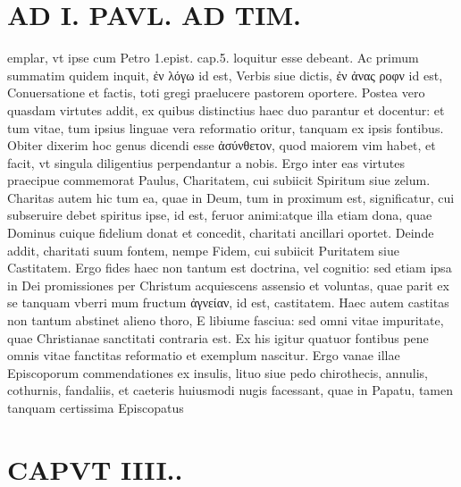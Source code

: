 \documentclass{article}
\begin{document}
\begin{pages}
\section*{AD I. PAVL. AD TIM. }
\marginpar{[ p.250 ]}\pstart emplar, vt ipse cum Petro 1.epist. cap.5. loquitur esse debeant. Ac primum summatim quidem inquit, ἐν λόγω id est, Verbis siue dictis, ἐν ἀνας ροφν id est, Conuersatione et factis, toti gregi praelucere pastorem oportere. Postea vero quasdam virtutes addit, ex quibus distinctius haec duo parantur et docentur: et tum vitae, tum ipsius linguae vera reformatio oritur, tanquam ex ipsis fontibus. Obiter dixerim hoc genus dicendi esse ἀσύνθετον, quod maiorem vim habet, et facit, vt singula diligentius perpendantur a nobis. Ergo inter eas virtutes praecipue commemorat Paulus, Charitatem, cui subiicit Spiritum siue zelum. Charitas autem hic tum ea, quae in Deum, tum in proximum est, significatur, cui subseruire debet spiritus ipse, id est, feruor animi:atque illa etiam dona, quae Dominus cuique fidelium donat et concedit, charitati ancillari oportet. Deinde addit, charitati suum fontem, nempe Fidem, cui subiicit Puritatem siue Castitatem. Ergo fides haec non tantum est doctrina, vel cognitio: sed etiam ipsa in Dei promissiones per Christum acquiescens assensio et voluntas, quae parit ex se tanquam vberri mum fructum ἀγνείαν, id est, castitatem. Haec autem castitas non tantum abstinet alieno thoro, E libiume fasciua: sed omni vitae impuritate, quae Christianae sanctitati contraria est. Ex his igitur quatuor fontibus pene omnis vitae fanctitas reformatio et exemplum nascitur. Ergo vanae illae Episcoporum commendationes ex insulis, lituo siue pedo chirothecis, annulis, cothurnis, fandaliis, et caeteris huiusmodi nugis facessant, quae in Papatu, tamen tanquam certissima Episcopatus  \pend
\section*{CAPVT  IIII.. }
\marginpar{[ p.231 ]}\pstart {}
{}

\end{pages}
\end{document}
